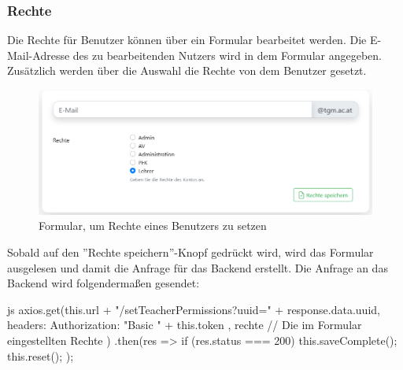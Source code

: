 \subsubsection{Rechte}
Die Rechte für Benutzer können über ein Formular bearbeitet werden. Die E-Mail-Adresse des zu bearbeitenden Nutzers wird in dem Formular angegeben. Zusätzlich werden über die Auswahl die Rechte von dem Benutzer gesetzt.
\begin{figure}[H]
	\centering
	\includegraphics[width=1\linewidth]{images/rights}
	\caption[Formular der Rechte]{Formular, um Rechte eines Benutzers zu setzen}
	\label{fig:rightsform}
\end{figure}
Sobald auf den ''Rechte speichern''-Knopf gedrückt wird, wird das Formular ausgelesen und damit die Anfrage für das Backend erstellt. Die Anfrage an das Backend wird folgendermaßen gesendet:
\begin{code}{js}
	axios.get(this.url + "/setTeacherPermissions?uuid=" + response.data.uuid,
	{
		headers: {
			Authorization: "Basic " + this.token
		}
	}, rechte	// Die im Formular eingestellten Rechte
	)
	.then(res => {
		if (res.status === 200) {
			this.saveComplete();
			this.reset();
		}
	});
\end{code}
~\\